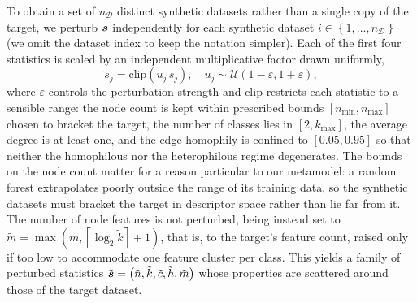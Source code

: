 To obtain a set of \( n_{\mathcal{D}} \) distinct synthetic datasets rather than a single copy of the target, we perturb \( \boldsymbol{s} \) independently for each synthetic dataset \( i \in \left\{ 1, \dots, n_{\mathcal{D}} \right\} \) (we omit the dataset index to keep the notation simpler). Each of the first four statistics is scaled by an independent multiplicative factor drawn uniformly,
\begin{equation*}
	\tilde{s}_j = \mathrm{clip} \left( u_j \, s_j \right), \quad u_j \sim \mathcal{U} \left( 1 - \varepsilon, 1 + \varepsilon \right),
\end{equation*}
where \( \varepsilon \) controls the perturbation strength and \( \mathrm{clip} \) restricts each statistic to a sensible range: the node count is kept within prescribed bounds \( \left[ n_{\min}, n_{\max} \right] \) chosen to bracket the target, the number of classes lies in \( \left[ 2, k_{\max} \right] \), the average degree is at least one, and the edge homophily is confined to \( \left[ 0.05, 0.95 \right] \) so that neither the homophilous nor the heterophilous regime degenerates. The bounds on the node count matter for a reason particular to our metamodel: a random forest extrapolates poorly outside the range of its training data, so the synthetic datasets must bracket the target in descriptor space rather than lie far from it. The number of node features is not perturbed, being instead set to \( \tilde{m} = \max \left( m, \left\lceil \log_2 \tilde{k} \right\rceil + 1 \right) \), that is, to the target's feature count, raised only if too low to accommodate one feature cluster per class. This yields a family of perturbed statistics \( \tilde{\boldsymbol{s}} = \left( \tilde{n}, \tilde{k}, \tilde{c}, \tilde{h}, \tilde{m} \right) \) whose properties are scattered around those of the target dataset.

